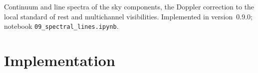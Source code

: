 \label{ch:spectral-lines}

Continuum and line spectra of the sky components, the Doppler correction to
the local standard of rest and multichannel visibilities. Implemented in
version~0.9.0; notebook \texttt{09\_spectral\_lines.ipynb}.

\section{Implementation}

